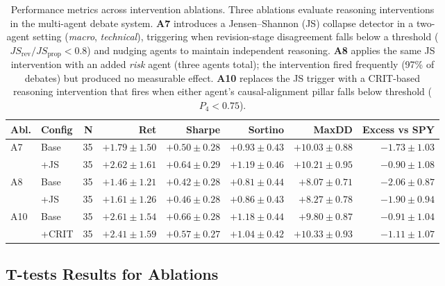 \documentclass{article}
\begin{document}
\begin{table}[H]
\centering
\small
\begin{tabular}{llrrrrrr}
\toprule
\textbf{Abl.} & \textbf{Config} & \textbf{N} & \textbf{Ret} & \textbf{Sharpe} & \textbf{Sortino} & \textbf{MaxDD} & \textbf{Excess vs SPY} \\
\midrule
\multirow{2}{*}{A7}
& Base & 35 & $+1.79 \pm 1.50$ & $+0.50 \pm 0.28$ & $+0.93 \pm 0.43$ & $+10.03 \pm 0.88$ & $-1.73 \pm 1.03$ \\
& +JS & 35 & $+2.62 \pm 1.61$ & {\color{darkgreen}$\mathbf{+0.64 \pm 0.29}$} & {\color{darkgreen}$\mathbf{+1.19 \pm 0.46}$} & $+10.21 \pm 0.95$ & {\color{darkgreen}$-0.90 \pm 1.08$} \\
\midrule
\multirow{2}{*}{A8}
& Base & 35 & $+1.46 \pm 1.21$ & $+0.42 \pm 0.28$ & $+0.81 \pm 0.44$ & $+8.07 \pm 0.71$ & $-2.06 \pm 0.87$ \\
& +JS & 35 & $+1.61 \pm 1.26$ & $+0.46 \pm 0.28$ & $+0.86 \pm 0.43$ & $+8.27 \pm 0.78$ & $-1.90 \pm 0.94$ \\
\midrule
\multirow{2}{*}{A10}
& Base & 35 & $+2.61 \pm 1.54$ & $+0.66 \pm 0.28$ & $+1.18 \pm 0.44$ & $+9.80 \pm 0.87$ & $-0.91 \pm 1.04$ \\
& +CRIT & 35 & $+2.41 \pm 1.59$ & $+0.57 \pm 0.27$ & $+1.04 \pm 0.42$ & {\color{red}$\mathbf{+10.33 \pm 0.93}$} & $-1.11 \pm 1.07$ \\
\bottomrule
\end{tabular}
\vspace{6pt}
\caption{Performance metrics across intervention ablations. Three ablations evaluate reasoning interventions in the multi-agent debate system. \textbf{A7} introduces a Jensen--Shannon (JS) collapse detector in a two-agent setting 
(\textit{macro}, \textit{technical}), triggering when revision-stage disagreement falls below a threshold 
($JS_{\text{rev}} / JS_{\text{prop}} < 0.8$) and nudging agents to maintain independent reasoning. 
\textbf{A8} applies the same JS intervention with an added \textit{risk} agent (three agents total); 
the intervention fired frequently (97\% of debates) but produced no measurable effect. 
\textbf{A10} replaces the JS trigger with a CRIT-based reasoning intervention that fires when 
either agent's causal-alignment pillar falls below threshold ($P_4 < 0.75$).}
\vspace{-10pt}
\label{tab:financial-results}

\end{table}

\subsection{T-tests Results for Ablations}
\label{app:paired-ttests}
\end{document}
